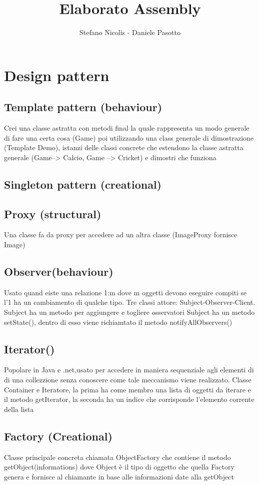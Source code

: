 \documentclass[12pt]{article}
\title{Elaborato Assembly}
\author{Stefano Nicolis - Daniele Pasotto}
\begin{document}
\tableofcontents

\section{Design pattern}

\subsection{Template pattern (behaviour)}
Crei una classe astratta con metodi final la quale rappresenta un modo generale di fare una certa cosa (Game)
poi utilizzando una class generale di dimostrazione (Template Demo), istanzi delle classi concrete che estendono
la classe astratta generale (Game--> Calcio, Game --> Cricket) e dimostri che funziona
\subsection{Singleton pattern (creational)}
\subsection{Proxy (structural)}
Una classe fa da proxy per accedere ad un altra classe
(ImageProxy fornisce Image)
\subsection{Observer(behaviour)}
Usato quand eiste una relazione 1:m dove m oggetti devono eseguire compiti
se l'1 ha un cambiamento di qualche tipo.
Tre classi attore: Subject-Observer-Client.
Subject ha un metodo per aggiungere e togliere osservatori
Subject ha un metodo setState(), dentro di esso viene richiamtato il metodo notifyAllObservers()
\subsection{Iterator()}
Popolare in Java e .net,usato per accedere in maniera sequenziale agli elementi di
di una collezzione senza conoscere come tale meccanismo viene realizzato.
Classe Container e Iteratore, la prima ha come membro una lista di oggetti da iterare
e il metodo getIterator, la seconda ha un indice che corrisponde l'elemento corrente della lista
\subsection{Factory (Creational)}
Classe principale concreta chiamata ObjectFactory che contiene il metodo getObject(informations) dove Object
è il tipo di oggetto che quella Factory genera e fornisce al chiamante in base alle informazioni date alla getObject
\end{document}
